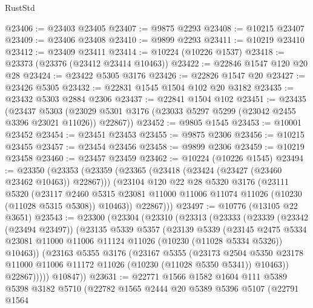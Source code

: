 \begin{lexlean}{RustStd}
\begin{coremodule}
@23406 := @23403 @23405
@23407 := @9875 @2293
@23408 := @10215 @23407
@23409 := @23406 @23408
@23410 := @9899 @2293
@23411 := @10219 @23410
@23412 := @23409 @23411
@23414 := @10224 (@10226 @1537)
@23418 := @23373 (@23376 (@23412 @23414 @10463))
@23422 := @22846 @1547 @120 @20 @28
@23424 := @23422 @5305 @3176
@23426 := @22826 @1547 @20
@23427 := @23426 @5305
@23432 := @22831 @1545 @1504 @102 @20 @3182
@23435 := @23432 @5303 @2884 @2306
@23437 := @22841 @1504 @102
@23451 := @23435
    (@23437
      @5303
      (@23029 @5301 @3176 (@23033 @5297 @5299 (@23042 @2455 @3396 @23021 @11026)) @22867))
@23452 := @9805 @1545
@23453 := @10001 @23452
@23454 := @23451 @23453
@23455 := @9875 @2306
@23456 := @10215 @23455
@23457 := @23454 @23456
@23458 := @9899 @2306
@23459 := @10219 @23458
@23460 := @23457 @23459
@23462 := @10224 (@10226 @1545)
@23494 := @23350
    (@23353
      (@23359
        (@23365 (@23418 (@23424 (@23427 (@23460 @23462 @10463)) @22867)))
        (@23104
          @120
          @22
          @28
          @5320
          @3176
          (@23111
            @5320
            (@23117
              @2460
              @5315
              @23081
              @11000
              @11006
              @11074
              @11026
              (@10230 (@11028 @5315 @5308))
              @10463))
          @22867)))
@23497 := @10776 (@13105 @22 @3651)
@23543 := @23300
    (@23304
      (@23310
        (@23313
          (@23333
            (@23339
              (@23342 (@23494 @23497))
              (@23135
                @5339
                @5357
                (@23139
                  @5339
                  (@23145
                    @2475
                    @5334
                    @23081
                    @11000
                    @11006
                    @11124
                    @11026
                    (@10230 (@11028 @5334 @5326))
                    @10463))
                (@23163
                  @5355
                  @3176
                  (@23167
                    @5355
                    (@23173
                      @2504
                      @5350
                      @23178
                      @11000
                      @11006
                      @11172
                      @11026
                      (@10230 (@11028 @5350 @5341))
                      @10463))
                  @22867)))))
        @10847))
@23631 := @22771
    @1566
    @1582
    @1604
    @111
    @5389
    @5398
    @3182
    @5710
    (@22782
      @1565
      @2444
      @20
      @5389
      @5396
      @5107
      (@22791
        @1564

\end{coremodule}
\end{lexlean}
